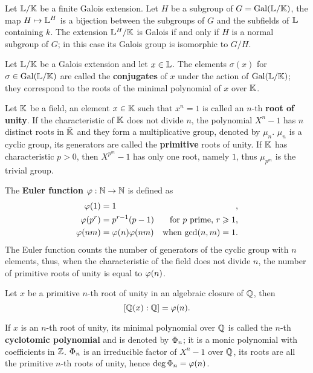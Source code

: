 \begin{theorem}
  Let $\mathbb{L}/\mathbb{K}$ be a finite Galois extension. Let $H$ be a subgroup of
  $G=\operatorname{Gal}(\mathbb{L}/\mathbb{K})$, the map $H\mapsto \mathbb{L}^H$ is a bijection between
  the subgroups of $G$ and the subfields of $\mathbb{L}$ containing $k$. The
  extension $\mathbb{L}^H/\mathbb{K}$ is Galois if and only if $H$ is a normal
  subgroup of $G$; in this case its Galois group is isomorphic to
  $G/H$.
\end{theorem}

Let $\mathbb{L}/\mathbb{K}$ be a Galois extension and let $x\in\mathbb{L}$. The elements
$\sigma(x)$ for $\sigma\in\operatorname{Gal}(\mathbb{L}/\mathbb{K})$ are called the
\textbf{conjugates} of $x$ under the action
of $\operatorname{Gal}(\mathbb{L}/\mathbb{K})$; they correspond to the roots of the minimal
polynomial of $x$ over $\mathbb{K}$.

Let $\mathbb{K}$ be a field, an element $x\in \mathbb{K}$ such that $x^n=1$ is called
an $n$-th \textbf{root of unity}. If the
characteristic of $\mathbb{K}$ does not divide $n$, the polynomial $X^n-1$ has
$n$ distinct roots in $\bar{\mathbb{K}}$ and they form a multiplicative
group, denoted by $\mu_n$. $\mu_n$ is a cyclic group, its generators
are called the 
 \textbf{primitive} roots of unity.  If
$\mathbb{K}$ has characteristic $p>0$, then $X^{p^m}-1$ has only one root,
namely $1$, thus $\mu_{p^m}$ is the trivial group. 

The \textbf{Euler function} $\varphi:\mathbb{N}\rightarrow\mathbb{N}$ is
defined as
\begin{align*}
  \varphi(1) &= 1 &\text{,}\\
  \varphi(p^r) &= p^{r-1}(p-1) &\text{for $p$ prime, $r\geqslant1$,}\\
  \varphi(nm) &= \varphi(n)\varphi(nm) &\text{when $\gcd(n,m)=1$.}
\end{align*}
The Euler function counts the number of generators of the cyclic group
with $n$ elements, thus, when the characteristic of the field does not
divide $n$, the number of primitive roots of unity is equal to $\varphi(n)$.

\begin{theorem}
  Let $x$ be a primitive $n$-th root of unity in an algebraic closure
  of $\mathbb{Q}$, then
  \[[\mathbb{Q}(x):\mathbb{Q}]=\varphi(n)\text{.}\]
\end{theorem}

If $x$ is an $n$-th root of unity, its minimal polynomial over $\mathbb{Q}$ is
called the $n$-th \textbf{cyclotomic
  polynomial} and is denoted by $\Phi_n$; it is a monic polynomial
with coefficients in $\mathbb{Z}$. $\Phi_n$ is an irreducible factor of
$X^n-1$ over $\mathbb{Q}$, its roots are all the primitive $n$-th roots of
unity, hence $\deg\Phi_n=\varphi(n)$.

